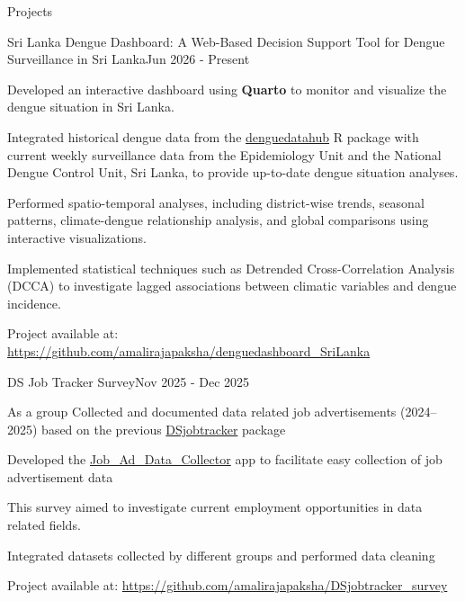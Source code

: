 \documentclass{resume} %
\begin{document}
\begin{rSection}{Projects}
		\begin{rSubsection}
			{Sri Lanka Dengue Dashboard: A Web-Based Decision Support Tool for Dengue \\ Surveillance in Sri Lanka}{Jun 2026 - Present}{}{}
			\item Developed an interactive dashboard using \textbf{Quarto} to monitor and visualize the dengue situation in Sri Lanka.
			\item Integrated historical dengue data from the \href{https://thiyangt.github.io/denguedatahubweb/}{denguedatahub} R package with current weekly surveillance data from the Epidemiology Unit and the National Dengue Control Unit, Sri Lanka, to provide up-to-date dengue situation analyses.
			\item Performed spatio-temporal analyses, including district-wise trends, seasonal patterns, climate-dengue relationship analysis, and global comparisons using interactive visualizations.
			\item Implemented statistical techniques such as Detrended Cross-Correlation Analysis (DCCA) to investigate lagged associations between climatic variables and dengue incidence.
		\end{rSubsection}
		\vspace{-0.3cm}
		\item Project available at:
		\href{https://github.com/amalirajapaksha/denguedashboard_SriLanka}{https://github.com/amalirajapaksha/denguedashboard\_SriLanka}
		
		\vspace{0.7 cm}
		
		\begin{rSubsection}
			{DS Job Tracker Survey}{Nov 2025 - Dec 2025}{}{}
			\item As a group Collected and documented data related job advertisements (2024--2025) based on the previous \href{https://github.com/thiyangt/DSjobtracker}{DSjobtracker} package
			\item Developed the \href{https://github.com/amalirajapaksha/Job_Ad_Data_Collector}{Job\_Ad\_Data\_Collector} app to facilitate easy collection of job advertisement data
			\item This survey aimed to investigate current employment opportunities in data related fields.
			\item Integrated datasets collected by different groups and performed data cleaning
		\end{rSubsection}	
		\vspace{-0.3 cm}
		\item Project available at:
		\href{https://github.com/amalirajapaksha/DSjobtracker_survey}{https://github.com/amalirajapaksha/DSjobtracker\_survey}  
		

\end{rSection}
\end{document}
